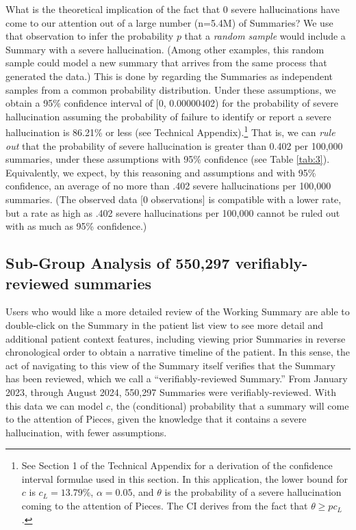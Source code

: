 \documentclass{style/myclass}
\begin{document}
What is the theoretical implication of the fact that 0 severe hallucinations have come to our attention out of a large number (n=5.4M) of Summaries? We use that observation to infer the probability $p$ that a \textit{random sample}  would include a Summary with a severe hallucination. (Among other examples, this random sample could model a new summary that arrives from the same process that generated the data.) This is done by regarding the Summaries as independent samples from a common probability distribution. Under these assumptions, we obtain a 95\% confidence interval of [0, 0.00000402) for the probability of severe hallucination assuming the probability of failure to identify or report a severe hallucination is 86.21\% or less (see Technical Appendix).\footnote{See Section 1 of the Technical Appendix for a derivation of the confidence interval formulae used in this section. In this application, the lower bound for $c$ is $c_L =13.79\%$, $\alpha=0.05$, and $\theta$ is the probability of a severe hallucination coming to the attention of Pieces. The CI derives from the fact that $\theta \geq pc_L$ .} That is, we can \textit{rule out} that the probability of severe hallucination is greater than 0.402 per 100,000 summaries, under these assumptions with 95\% confidence (see Table \ref{tab:3}). Equivalently, we expect, by this reasoning and assumptions and with 95\% confidence, an average of no more than .402 severe hallucinations per 100,000 summaries. (The observed data [0 observations] is compatible with a lower rate, but a rate as high as .402 severe hallucinations per 100,000 cannot be ruled out with as much as 95\% confidence.)

\subsection{Sub-Group Analysis of 550,297 verifiably-reviewed summaries}

Users who would like a more detailed review of the Working Summary are able to double-click on the Summary in the patient list view to see more detail and additional patient context features, including viewing prior Summaries in reverse chronological order to obtain a narrative timeline of the patient. In this sense, the act of navigating to this view of the Summary itself verifies that the Summary has been reviewed, which we call a “verifiably-reviewed Summary.” From January 2023, through August 2024, 550,297 Summaries were verifiably-reviewed. With this data we can model $c$, the (conditional) probability that a summary will come to the attention of Pieces, given the knowledge that it contains a severe hallucination, with fewer assumptions.
\end{document}
